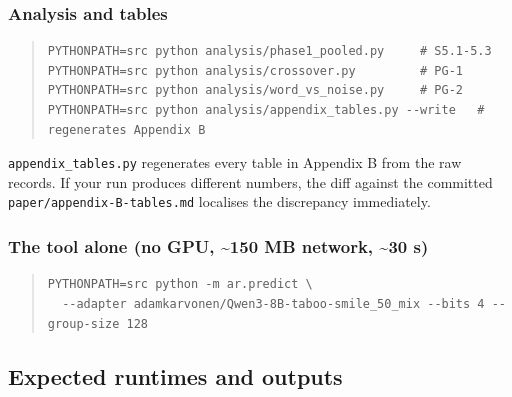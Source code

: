 \subsubsection{Analysis and tables}

\begin{quote}\tiny\begin{verbatim}
PYTHONPATH=src python analysis/phase1_pooled.py     # S5.1-5.3
PYTHONPATH=src python analysis/crossover.py         # PG-1
PYTHONPATH=src python analysis/word_vs_noise.py     # PG-2
PYTHONPATH=src python analysis/appendix_tables.py --write   # regenerates Appendix B
\end{verbatim}\end{quote}

\texttt{appendix\_\allowbreak{}tables.\allowbreak{}py} regenerates every table in Appendix B from the raw records. If your run produces different numbers, the diff against the committed \texttt{paper/\allowbreak{}appendix-\allowbreak{}B-\allowbreak{}tables.\allowbreak{}md} localises the discrepancy immediately.

\subsubsection{The tool alone (no GPU, \textasciitilde{}150 MB network, \textasciitilde{}30 s)}

\begin{quote}\tiny\begin{verbatim}
PYTHONPATH=src python -m ar.predict \
  --adapter adamkarvonen/Qwen3-8B-taboo-smile_50_mix --bits 4 --group-size 128
\end{verbatim}\end{quote}

\subsection{Expected runtimes and outputs}

